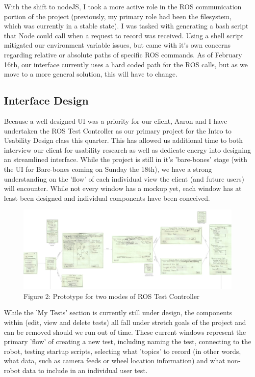 \documentclass[onecolumn, draftclsnofoot,10pt, compsoc]{IEEEtran}
\begin{document}
With the shift to nodeJS, I took a more active role in the ROS communication portion of the project (previously, my primary role had been the filesystem, which was currently in a stable state). I was tasked with generating a bash script that Node could call when a request to record was received. Using a shell script mitigated our environment variable issues, but came with it's own concerns regarding relative or absolute paths of specific ROS commands. As of February 16th, our interface currently uses a hard coded path for the ROS calls, but as we move to a more general solution, this will have to change. 

\subsection{Interface Design}
Because a well designed UI was a priority for our client, Aaron and I have undertaken the ROS Test Controller as our primary project for the Intro to Usability Design class this quarter. This has allowed us additional time to both interview our client for usability research as well as dedicate energy into designing an streamlined interface. While the project is still in it's 'bare-bones' stage (with the UI for Bare-bones coming on Sunday the 18th), we have a strong understanding on the 'flow' of each individual view the client (and future users) will encounter. While not every window has a mockup yet, each window has at least been designed and individual components have been conceived. 

\begin{figure}[H]
	\centering
	\includegraphics[scale=0.25]{Prototype.jpg}
	\caption{Figure 2: Prototype for two modes of ROS Test Controller}
\end{figure}

While the 'My Tests' section is currently still under design, the components within (edit, view and delete tests) all fall under stretch goals of the project and can be removed should we run out of time. These current windows represent the primary 'flow' of creating a new test, including naming the test, connecting to the robot, testing startup scripts, selecting what 'topics' to record (in other words, what data, such as camera feeds or wheel location information) and what non-robot data to include in an individual user test.
\end{document}
